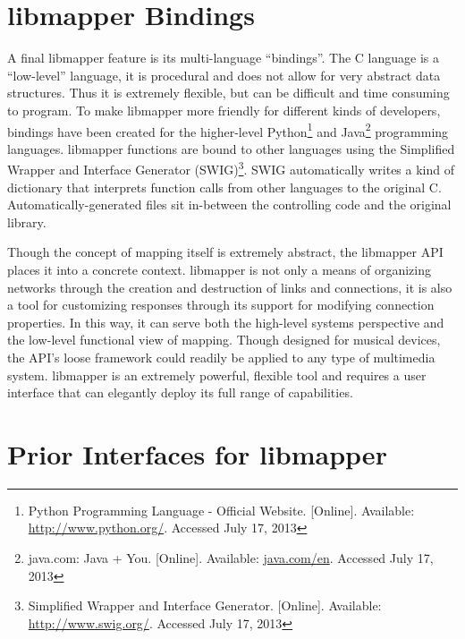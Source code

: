 	\section{libmapper Bindings} %
	\label{sec:libmapper_bindings}

A final libmapper feature is its multi-language ``bindings''. The C language is a ``low-level'' language, it is procedural and does not allow for very abstract data structures. Thus it is extremely flexible, but can be difficult and time consuming to program. To make libmapper more friendly for different kinds of developers, bindings have been created for the higher-level 
Python\footnote{Python Programming Language - Official Website. [Online]. Available: \url{http://www.python.org/}. Accessed July 17, 2013} and Java\footnote{java.com: Java + You. [Online]. Available: \url{java.com/en}. Accessed July 17, 2013} 
programming languages. libmapper functions are bound to other languages using the 
Simplified Wrapper and Interface Generator (SWIG)\footnote{Simplified Wrapper and Interface Generator. [Online]. Available: \url{http://www.swig.org/}. Accessed July 17, 2013}.
SWIG automatically writes a kind of dictionary that interprets function calls from other languages to the original C. Automatically-generated files sit in-between the controlling code and the original library. 

Though the concept of mapping itself is extremely abstract, the libmapper API places it into a concrete context. libmapper is not only a means of organizing networks through the creation and destruction of links and connections, it is also a tool for customizing responses through its support for modifying connection properties. In this way, it can serve both the high-level systems perspective and the low-level functional view of mapping. Though designed for musical devices, the API's loose framework could readily be applied to any type of multimedia system. libmapper is an extremely powerful, flexible tool and requires a user interface that can elegantly deploy its full range of capabilities.


\section{Prior Interfaces for libmapper} %
\label{sec:prior_interfaces_for_libmapper}


